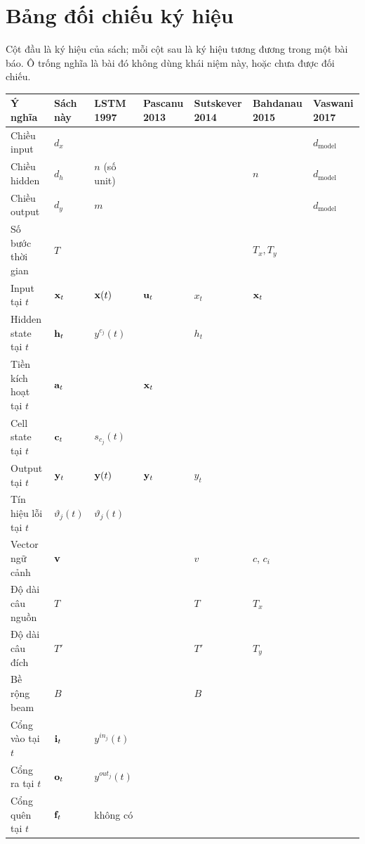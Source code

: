 \chapter{Bảng đối chiếu ký hiệu}
\label{app:ky-hieu}

Cột đầu là ký hiệu của sách; mỗi cột sau là ký hiệu tương đương trong một bài
báo. Ô trống nghĩa là bài đó không dùng khái niệm này, hoặc chưa được đối chiếu.

\footnotesize
\setlength{\tabcolsep}{2pt}
\begin{tabular}{@{}lllllll@{}}
\toprule
Ý nghĩa & Sách này & LSTM 1997 & Pascanu 2013 & Sutskever 2014 & Bahdanau 2015 & Vaswani 2017 \\
\midrule
Chiều input & \(d_x\) & & & & & \(d_{\mathrm{model}}\) \\
Chiều hidden & \(d_h\) & \(n\) (số unit) & & & \(n\) & \(d_{\mathrm{model}}\) \\
Chiều output & \(d_y\) & \(m\) & & & & \(d_{\mathrm{model}}\) \\
Số bước thời gian & \(T\) & & & & \(T_x, T_y\) & \\
\midrule
Input tại \(t\) & \(\mathbf{x}_t\) & \(\mathbf{x}(t)\) & \(\mathbf{u}_t\) & \(x_t\) & \(\mathbf{x}_t\) & \\
Hidden state tại \(t\) & \(\mathbf{h}_t\) & \(y^{c_j}(t)\) & & \(h_t\) & & \\
Tiền kích hoạt tại \(t\) & \(\mathbf{a}_t\) & & \(\mathbf{x}_t\) & & & \\
Cell state tại \(t\) & \(\mathbf{c}_t\) & \(s_{c_j}(t)\) & & & & \\
Output tại \(t\) & \(\mathbf{y}_t\) & \(\mathbf{y}(t)\) & \(\mathbf{y}_t\) & \(y_t\) & & \\
Tín hiệu lỗi tại \(t\) & \(\vartheta_j(t)\) & \(\vartheta_j(t)\) & & & & \\
\midrule
Vector ngữ cảnh & \(\mathbf{v}\) & & & \(v\) & \(c\), \(c_i\) & \\
Độ dài câu nguồn & \(T\) & & & \(T\) & \(T_x\) & \\
Độ dài câu đích & \(T'\) & & & \(T'\) & \(T_y\) & \\
Bề rộng beam & \(B\) & & & \(B\) & & \\
\midrule
Cổng vào tại \(t\) & \(\mathbf{i}_t\) & \(y^{in_j}(t)\) & & & & \\
Cổng ra tại \(t\) & \(\mathbf{o}_t\) & \(y^{out_j}(t)\) & & & & \\
Cổng quên tại \(t\) & \(\mathbf{f}_t\) & không có & & & & \\

\end{tabular}
